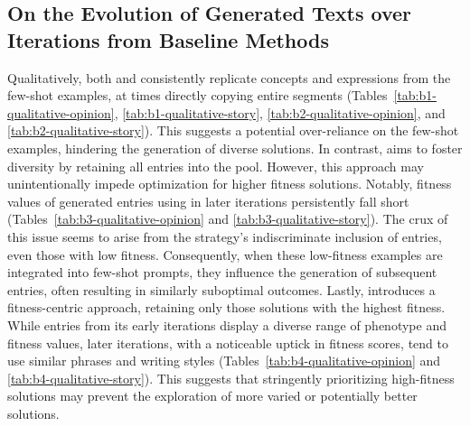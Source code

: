 \subsection{On the Evolution of Generated Texts over Iterations from Baseline Methods}\label{app:iterations_summary_baseline}
Qualitatively, both \baseone{} and \basetwo{} consistently replicate concepts and expressions from the few-shot examples, at times directly copying entire segments (Tables~\ref{tab:b1-qualitative-opinion}, \ref{tab:b1-qualitative-story}, \ref{tab:b2-qualitative-opinion}, and \ref{tab:b2-qualitative-story}). This suggests a potential over-reliance on the few-shot examples, hindering the generation of diverse solutions. In contrast, \basethree{} aims to foster diversity by retaining all entries into the pool. However, this approach may unintentionally impede optimization for higher fitness solutions. Notably, fitness values of generated entries using \basethree{} in later iterations persistently fall short (Tables~\ref{tab:b3-qualitative-opinion} and \ref{tab:b3-qualitative-story}). The crux of this issue seems to arise from the strategy's indiscriminate inclusion of entries, even those with low fitness. Consequently, when these low-fitness examples are integrated into few-shot prompts, they influence the generation of subsequent entries, often resulting in similarly suboptimal outcomes. Lastly, \basefour{} introduces a fitness-centric approach, retaining only those solutions with the highest fitness. While entries from its early iterations display a diverse range of phenotype and fitness values, later iterations, with a noticeable uptick in fitness scores, tend to use similar phrases and writing styles (Tables~\ref{tab:b4-qualitative-opinion} and \ref{tab:b4-qualitative-story}). This suggests that stringently prioritizing high-fitness solutions may prevent the exploration of more varied or potentially better solutions.

\clearpage
\newpage
